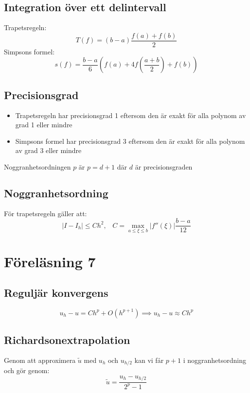 \documentclass[a4paper,11pt]{article}
\begin{document}
\subsection{Integration över ett delintervall}
Trapetsregeln:
\[
T(f) = (b-a)\frac{f(a) + f(b)}{2}
\]
Simpsons formel:
\[
s(f) = \frac{b-a}{6}(f(a) + 4f(\frac{a+b}{2}) + f(b))
\]

\subsection{Precisionsgrad}
\begin{itemize}
    \item Trapetsregeln har precisionsgrad 1 eftersom den är exakt för alla polynom av grad 1 eller mindre
    \item Simpsons formel har precisionsgrad 3 eftersom den är exakt för alla polynom av grad 3 eller mindre
\end{itemize}
Noggranhetsordningen $p$ är $p = d + 1$ där $d$ är precisionsgraden

\subsection{Noggranhetsordning}
För trapetsregeln gäller att:
\[
|I - I_h| \leq Ch^2, \hspace{10pt} C = \max_{a \leq \xi \leq b} |f''(\xi)|\frac{b-a}{12}
\]

\section{Föreläsning 7}
\subsection{Reguljär konvergens}
\[
u_h - u = Ch^p + O(h^{p+1}) \implies u_h - u \approx Ch^p
\]

\subsection{Richardsonextrapolation}
Genom att approximera $\tilde{u}$ med $u_h$ och $u_{h/2}$ kan vi får $p + 1$ i noggranhetsordning och gör genom:
\[\tilde{u} = \frac{u_h - u_{h/2}}{2^p - 1}\]
\end{document}
